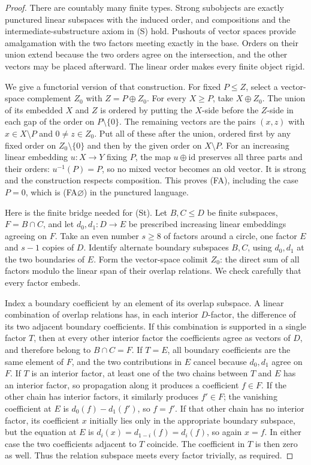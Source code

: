 \begin{proof}
There are countably many finite types. Strong subobjects are exactly
punctured linear subspaces with the induced order, and compositions and
the intermediate-substructure axiom in (S) hold. Pushouts of vector
spaces provide amalgamation with the two factors meeting exactly in the
base. Orders on their union extend because the two orders agree on
the intersection, and the other vectors may be placed afterward.
The linear order makes every finite object rigid.

We give a functorial version of that construction. For fixed
$P\leq Z$, select a vector-space complement $Z_0$ with $Z=P\oplus Z_0$.
For every $X\geq P$, take $X\oplus Z_0$. The union of its embedded
$X$ and $Z$ is ordered by putting the $X$-side before the $Z$-side
in each gap of the order on $P\setminus\{0\}$. The remaining vectors
are the pairs $(x,z)$ with $x\in X\setminus P$ and $0\ne z\in Z_0$.
Put all of these after the union, ordered first by any fixed order on
$Z_0\setminus\{0\}$ and then by the given order on $X\setminus P$.
For an increasing linear embedding $u:X\to Y$ fixing $P$, the map
$u\oplus\mathrm{id}$ preserves all three parts and their orders:
$u^{-1}(P)=P$, so no mixed vector becomes an old vector. It is strong
and the construction respects composition. This proves (FA), including
the case $P=0$, which is (FA$\varnothing$) in the punctured language.

Here is the finite bridge needed for (St). Let $B,C\leq D$ be finite
subspaces, $F=B\cap C$, and let $d_0,d_1:D\to E$ be prescribed
increasing linear embeddings agreeing on $F$. Take an even number
$s\geq8$ of factors around a circle, one factor $E$ and $s-1$ copies
of $D$. Identify alternate boundary subspaces $B,C$, using $d_0,d_1$
at the two boundaries of $E$. Form the vector-space colimit $Z_0$:
the direct sum of all factors modulo the linear span of their overlap
relations. We check carefully that every factor embeds.

Index a boundary coefficient by an element of its overlap subspace.
A linear combination of overlap relations has, in each interior
$D$-factor, the difference of its two adjacent boundary coefficients.
If this combination is supported in a single factor $T$, then at every
other interior factor the coefficients agree as vectors of $D$, and
therefore belong to $B\cap C=F$. If $T=E$, all boundary coefficients
are the same element of $F$, and the two contributions in $E$ cancel
because $d_0,d_1$ agree on $F$. If $T$ is an interior factor, at least
one of the two chains between $T$ and $E$ has an interior factor, so
propagation along it produces a coefficient $f\in F$. If the other
chain has interior factors, it similarly produces $f'\in F$; the
vanishing coefficient at $E$ is $d_0(f)-d_1(f')$, so $f=f'$. If that
other chain has no interior factor, its coefficient $x$ initially
lies only in the appropriate boundary subspace, but the equation at
$E$ is $d_i(x)=d_{1-i}(f)=d_i(f)$, so again $x=f$. In either case
the two coefficients adjacent to $T$ coincide. The coefficient in
$T$ is then zero as well. Thus the
relation subspace meets every factor trivially, as required.


\end{proof}
